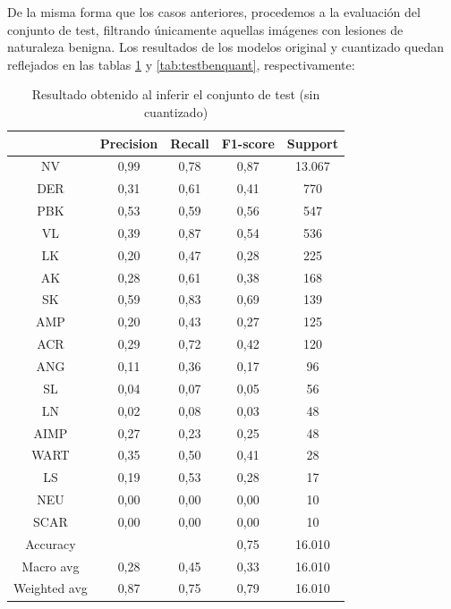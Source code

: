 De la misma forma que los casos anteriores, procedemos a la evaluación del conjunto de test, filtrando únicamente aquellas imágenes con lesiones de naturaleza benigna. Los resultados de los modelos original y cuantizado quedan reflejados en las tablas \ref{tab:testbenorig} y \ref{tab:testbenquant}, respectivamente:

\begin{table}[!ht]
	\centering
	\begin{tabular}{|c|c|c|c|c|}
		\hline
		~ & Precision & Recall & F1-score & Support \\ \hline
		NV & 0,99 & 0,78 & 0,87 & 13.067 \\ \hline
		DER & 0,31 & 0,61 & 0,41 & 770 \\ \hline
		PBK & 0,53 & 0,59 & 0,56 & 547 \\ \hline
		VL & 0,39 & 0,87 & 0,54 & 536 \\ \hline
		LK & 0,20 & 0,47 & 0,28 & 225 \\ \hline
		AK & 0,28 & 0,61 & 0,38 & 168 \\ \hline
		SK & 0,59 & 0,83 & 0,69 & 139 \\ \hline
		AMP & 0,20 & 0,43 & 0,27 & 125 \\ \hline
		ACR & 0,29 & 0,72 & 0,42 & 120 \\ \hline
		ANG & 0,11 & 0,36 & 0,17 & 96 \\ \hline
		SL & 0,04 & 0,07 & 0,05 & 56 \\ \hline
		LN & 0,02 & 0,08 & 0,03 & 48 \\ \hline
		AIMP & 0,27 & 0,23 & 0,25 & 48 \\ \hline
		WART & 0,35 & 0,50 & 0,41 & 28 \\ \hline
		LS & 0,19 & 0,53 & 0,28 & 17 \\ \hline
		NEU & 0,00 & 0,00 & 0,00 & 10 \\ \hline
		SCAR & 0,00 & 0,00 & 0,00 & 10 \\ \hline
		Accuracy & ~ & ~ & 0,75 & 16.010 \\ \hline
		Macro avg & 0,28 & 0,45 & 0,33 & 16.010 \\ \hline
		Weighted avg & 0,87 & 0,75 & 0,79 & 16.010 \\ \hline
	\end{tabular}
	\caption{Resultado obtenido al inferir el conjunto de test (sin cuantizado)}
	\label{tab:testbenorig}
\end{table}

